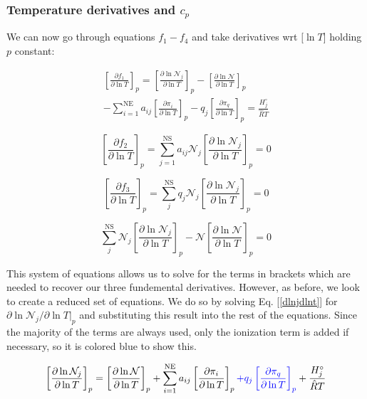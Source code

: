 \documentclass[10pt]{article}
\begin{document}
\begin{flushleft}
\subsubsection{Temperature derivatives and $c_p$}
We can now go through equations $f_1 - f_4$ and take derivatives wrt $[\ln T$] holding $p$ constant:

\begin{multline}
    \left[\frac{\partial f_1}{\partial \ln T}\right]_p = \left[\frac{\partial \ln \mathcal{N}_j}{\partial \ln T} \right]_p -\left[\frac{\partial \ln \mathcal{N}}{\partial \ln T} \right]_p \\- \sum_{i=1}^\text{NE} a_{ij} \left[\frac{\partial \pi_i}{\partial \ln T} \right]_p - q_j \left[ \frac{\partial \pi_q}{\partial \ln T} \right]_p = \frac{H_j^\circ}{\hat{R}T} \label{dlnjdlnt}
\end{multline}

\begin{equation}
\left[\frac{\partial f_2}{\partial \ln T}\right]_p = \sum_{j=1}^\text{NS} a_{ij} \mathcal{N}_j \left[ \frac{\partial \ln \mathcal{N}_j}{\partial \ln T} \right]_p = 0 
\end{equation}

\begin{equation}
    \left[\frac{\partial f_3}{\partial \ln T}\right]_p = \sum_j^\text{NS} q_j \mathcal{N}_j \left[ \frac{\partial \ln \mathcal{N}_j}{\partial \ln T} \right]_p = 0 
\end{equation}

\begin{equation}
    \sum_j^\text{NS} \mathcal{N}_j \left[ \frac{\partial \ln \mathcal{N}_j}{\partial \ln T} \right]_p - \mathcal{N} \left[ \frac{\partial \ln \mathcal{N}}{\partial \ln T} \right]_p = 0
\end{equation}

This system of equations allows us to solve for the terms in brackets which are needed to recover our three fundemental derivatives. However, as before, we look to create a reduced set of equations. We do so by solving Eq. [\ref{dlnjdlnt}] for $\partial \ln \mathcal{N}_j / \partial \ln T |_p$ and substituting this result into the rest of the equations. Since the majority of the terms are always used, only the ionization term is added if necessary, so it is colored blue to show this.

\begin{equation}
\left[\frac{\partial \ln \mathcal{N}_j}{\partial \ln T} \right]_p = \left[\frac{\partial \ln \mathcal{N}}{\partial \ln T} \right]_p + \sum_{i=1}^\text{NE} a_{ij} \left[\frac{\partial \pi_i}{\partial \ln T} \right]_p \textcolor{blue}{+ q_j \left[ \frac{\partial \pi_q}{\partial \ln T} \right]_p} + \frac{H_j^\circ}{\hat{R}T}
\end{equation}


\end{flushleft}
\end{document}
